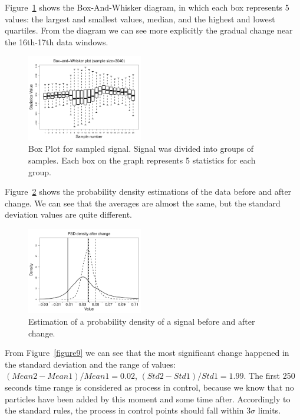 Figure~\ref{figure7} shows the Box-And-Whisker diagram, in which each box represents 5 values: the largest and smallest values, median, and the highest and lowest quartiles. From the diagram we can see more explicitly the gradual change near the 16th-17th data windows.

\begin{figure}[htb!]
\includegraphics[width=0.45\textwidth]{articles/pics/cfb_paper/PSD/PSDboxplot}
\caption{Box Plot for sampled signal. Signal was divided into groups of samples. Each box
on the graph represents 5 statistics for each group.}\label{figure7}
\end{figure}

Figure~\ref{figure8} shows the probability density estimations of the data before and after change. We can see that the averages are almost the same, but the standard deviation values are quite different.

\begin{figure}[htb!]
\includegraphics[width=0.45\textwidth]{articles/pics/cfb_paper/PSD/PSDdensity}
\caption{Estimation of a probability density of a signal before and after change.}\label{figure8}
\end{figure}

From Figure~\ref{figure9} we can see that the most significant change happened in the standard deviation and the range of values:
$(Mean2 - Mean1)/Mean1 = 0.02$, $(Std2 - Std1)/Std1 = 1.99$. The first 250 seconds time range is considered as process in control, because we know that no particles have been added by this moment and some time after. Accordingly to the standard rules, the process in control points should fall within $3\sigma$ limits. 

